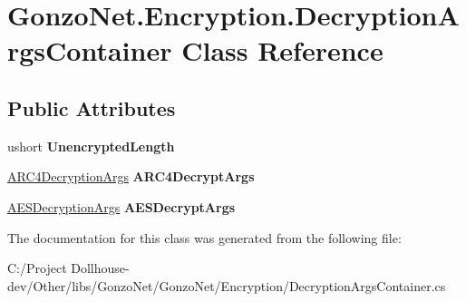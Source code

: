 \hypertarget{class_gonzo_net_1_1_encryption_1_1_decryption_args_container}{\section{Gonzo\+Net.\+Encryption.\+Decryption\+Args\+Container Class Reference}
\label{class_gonzo_net_1_1_encryption_1_1_decryption_args_container}
}
\subsection*{Public Attributes}
\begin{DoxyCompactItemize}
\item 
\hypertarget{class_gonzo_net_1_1_encryption_1_1_decryption_args_container_aa80807c697c0593252e859353a3e02e2}{ushort {\bfseries Unencrypted\+Length}}\label{class_gonzo_net_1_1_encryption_1_1_decryption_args_container_aa80807c697c0593252e859353a3e02e2}

\item 
\hypertarget{class_gonzo_net_1_1_encryption_1_1_decryption_args_container_aff747fde56872bfb15345d3bc2f0b432}{\hyperlink{class_gonzo_net_1_1_encryption_1_1_a_r_c4_decryption_args}{A\+R\+C4\+Decryption\+Args} {\bfseries A\+R\+C4\+Decrypt\+Args}}\label{class_gonzo_net_1_1_encryption_1_1_decryption_args_container_aff747fde56872bfb15345d3bc2f0b432}

\item 
\hypertarget{class_gonzo_net_1_1_encryption_1_1_decryption_args_container_a0616eaf14558b2776f714652baa1dae5}{\hyperlink{class_gonzo_net_1_1_encryption_1_1_a_e_s_decryption_args}{A\+E\+S\+Decryption\+Args} {\bfseries A\+E\+S\+Decrypt\+Args}}\label{class_gonzo_net_1_1_encryption_1_1_decryption_args_container_a0616eaf14558b2776f714652baa1dae5}

\end{DoxyCompactItemize}


The documentation for this class was generated from the following file\+:\begin{DoxyCompactItemize}
\item 
C\+:/\+Project Dollhouse-\/dev/\+Other/libs/\+Gonzo\+Net/\+Gonzo\+Net/\+Encryption/Decryption\+Args\+Container.\+cs\end{DoxyCompactItemize}
